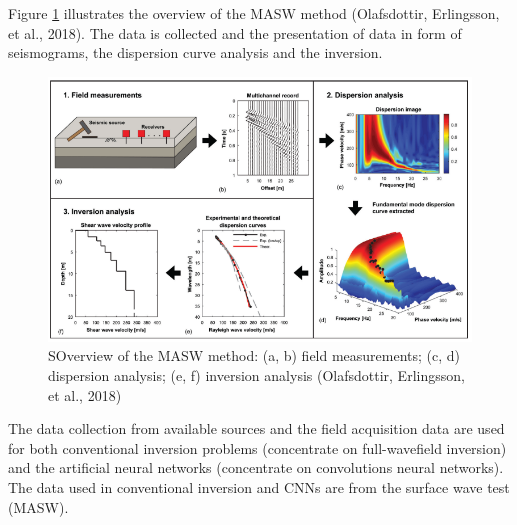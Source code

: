 Figure \ref{fig:inversionprocedure} illustrates the overview of the MASW method (Olafsdottir, Erlingsson, et al., 2018). The data is collected and the presentation of data in form of seismograms, the dispersion curve analysis and the inversion.

\begin{figure}
    \centering
    \includegraphics[scale=0.5]{images/inversionprocedure.png}
    \caption{SOverview of the MASW method: (a, b) field measurements; (c, d) dispersion analysis; (e, f) inversion analysis (Olafsdottir, Erlingsson, et al., 2018)}
    \label{fig:inversionprocedure}
\end{figure}

The data collection from available sources and the field acquisition data are used for both conventional inversion problems (concentrate on full-wavefield inversion) and the artificial neural networks (concentrate on convolutions neural networks). The data used in conventional inversion and CNNs are from the surface wave test (MASW). 

